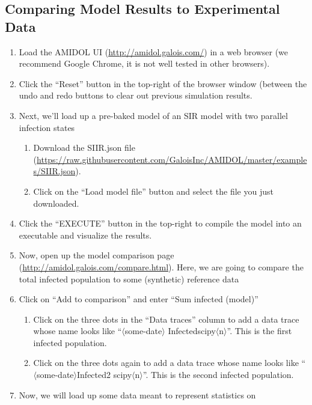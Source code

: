 \documentclass[12pt]{galois-whitepaper}
\begin{document}
\subsection{Comparing Model Results to Experimental Data}

\begin{enumerate}
\item Load the AMIDOL UI (\url{http://amidol.galois.com/}) in a web browser (we recommend Google Chrome, it
is not well tested in other browsers).
  
\item Click the “Reset” button in the top-right of the browser window (between the undo and redo buttons to clear out previous simulation results.
\item Next, we’ll load up a pre-baked model of an SIR model with two
  parallel infection states
  \begin{enumerate}
    \item Download the SIIR.json file (\url{https://raw.githubusercontent.com/GaloisInc/AMIDOL/master/examples/SIIR.json}).
  \item Click on the “Load model file” button and select the file you
    just downloaded.
  \end{enumerate}
\item Click the “EXECUTE” button in the top-right to compile the model into an executable and visualize the results.
\item Now, open up the model comparison page (\url{http://amidol.galois.com/compare.html}). Here, we are going to
compare the total infected population to some (synthetic) reference
data
\item Click on “Add to comparison” and enter “Sum infected (model)”
  \begin{enumerate}
    \item Click on the three dots in the “Data traces” column to add a
      data trace whose name looks like “$\langle$some-date$\rangle$\textunderscore
      Infected\textunderscore scipy\textunderscore $\langle$n$\rangle$”. This is the first infected population.
    \item Click on the three dots again to add a data trace whose name
      looks like “$\langle$some-date$\rangle$\textunderscore Infected2\textunderscore
      scipy\textunderscore $\langle$n$\rangle$”. This is the second
      infected population.
    \end{enumerate}
\item Now, we will load up some data meant to represent statistics on

\end{enumerate}
\end{document}
